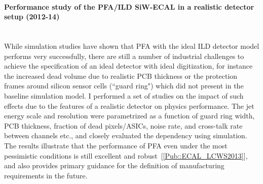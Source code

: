 \documentclass[12pt]{article}
\newcommand{\Subsubsection}[1]{\subsubsection*{#1}
\addcontentsline{toc}{subsubsection}{#1}}
\begin{document}
\paragraph{Performance study of the PFA/ILD SiW-ECAL in a realistic detector setup   (2012-14)}  \phantom{k} \vspace{3mm} \\
While simulation studies have shown that PFA with the ideal ILD detector model performs very successfully, 
there are still a number of industrial challenges to achieve the specification of an ideal detector with ideal digitization, 
for instance the increased dead volume due to realistic PCB thickness or the protection frames around silicon sensor cells (``guard ring") which did not present in the baseline simulation model.
I performed a set of studies on the impact of such effects due to the features of a realistic detector on physics performance. 
The jet energy scale and resolution were parametrized as a function of guard ring width,
PCB thickness, fraction of dead pixels/ASICs, noise rate, and cross-talk rate between channels etc., 
and closely evaluated the dependency using simulation. 
The results illustrate that the performance of PFA even under the most pessimistic conditions is still excellent and robust~[\ref{Pub::ECAL_LCWS2013}], 
and also provides primary guidance for the definition of manufacturing requirements in the future. 

\end{document}
